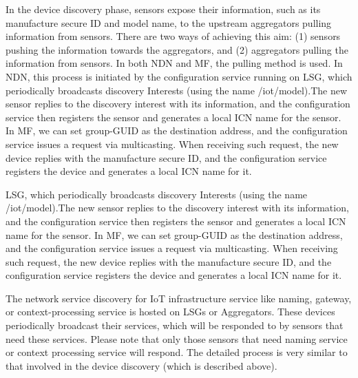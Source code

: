 In the device discovery phase, sensors expose their information, such
as its manufacture secure ID and model name, to the upstream
aggregators pulling information from sensors.  There are two ways of
achieving this aim: (1) sensors pushing the information towards the
aggregators, and (2) aggregators pulling the information from
sensors.  In both NDN and MF, the pulling method is used.  In NDN,
this process is initiated by the configuration service running on LSG, which periodically broadcasts discovery Interests (using the
name /iot/model).The new sensor replies to the discovery interest
with its information, and the configuration service then registers
the sensor and generates a local ICN name for the sensor.  In MF, we
can set group-GUID as the destination address, and the configuration
service issues a request via multicasting.  When receiving such
request, the new device replies with the manufacture secure ID, and
the configuration service registers the device and generates a local
ICN name for it.

LSG, which periodically broadcasts discovery Interests (using the
name /iot/model).The new sensor replies to the discovery interest
with its information, and the configuration service then registers
the sensor and generates a local ICN name for the sensor.  In MF, we
can set group-GUID as the destination address, and the configuration
service issues a request via multicasting.  When receiving such
request, the new device replies with the manufacture secure ID, and
the configuration service registers the device and generates a local
ICN name for it.

The network service discovery for IoT infrastructure service like
naming, gateway, or context-processing service is hosted on LSGs or
Aggregators.  These devices periodically broadcast their services,
which will be responded to by sensors that need these services.
Please note that only those sensors that need naming service or
context processing service will respond.  The detailed process is
very similar to that involved in the device discovery (which is described above).

